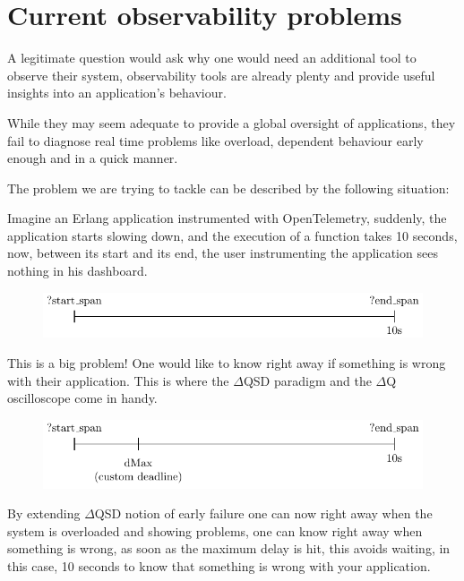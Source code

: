 \section{Current observability problems}

    A legitimate question would ask why one would need an additional tool to observe their system, observability tools are already plenty and provide useful insights into an application's behaviour.
    
    While they may seem adequate to provide a global oversight of applications, they fail to diagnose real time problems like overload, dependent behaviour early enough and in a quick manner. 
    
    The problem we are trying to tackle can be described by the following situation: 

Imagine an Erlang application instrumented with OpenTelemetry, suddenly, the application starts slowing down, and the execution of a function takes 10 seconds, now, between its start and its end, the user instrumenting the application sees nothing in his dashboard.
    \begin{figure}[H]
        \begin{center}
            \includegraphics{tikz/start_end.pdf}
        \end{center}
    \end{figure}
    This is a big problem! One would like to know right away if something is wrong with their application. This is where the $\Delta$QSD paradigm and the $\Delta$Q oscilloscope come in handy.
    \begin{figure}[H]
        \begin{center}
            \includegraphics{tikz/start_end_dmax.pdf}
        \end{center}
        \label{fig:otel_dmax}
    \end{figure} 
    By extending $\Delta$QSD notion of early failure one can now right away when the system is overloaded and showing problems, one can know right away when something is wrong, as soon as the maximum delay is hit, this avoids waiting, in this case, 10 seconds to know that something is wrong with your application. \label{timeout}

